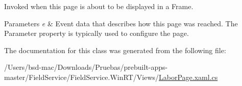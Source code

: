 Invoked when this page is about to be displayed in a Frame. 


\begin{DoxyParams}{Parameters}
{\em e} & Event data that describes how this page was reached. The Parameter property is typically used to configure the page.\\
\hline
\end{DoxyParams}


The documentation for this class was generated from the following file\+:\begin{DoxyCompactItemize}
\item 
/\+Users/bsd-\/mac/\+Downloads/\+Pruebas/prebuilt-\/apps-\/master/\+Field\+Service/\+Field\+Service.\+Win\+R\+T/\+Views/\hyperlink{_labor_page_8xaml_8cs}{Labor\+Page.\+xaml.\+cs}\end{DoxyCompactItemize}
